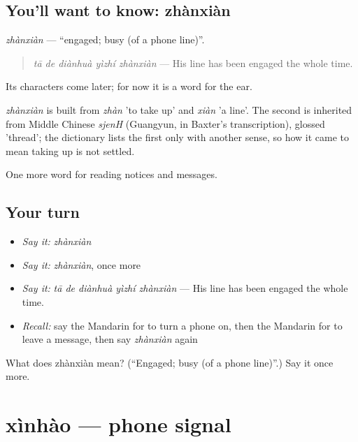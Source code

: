 \subsection*{You'll want to know: zhànxiàn}
\emph{zhànxiàn} — \textquotedblleft{}engaged; busy (of a phone line)\textquotedblright{}.

\begin{quote}
\emph{tā de diànhuà yìzhí zhànxiàn} — His line has been engaged the whole time.
\end{quote}

Its characters come later; for now it is a word for the ear.

\begin{cousinweb}
\emph{zhànxiàn} is built from \emph{zhàn} 'to take up' and \emph{xiàn} 'a line'. The second is inherited from Middle Chinese \emph{sjenH} (Guangyun, in Baxter's transcription), glossed 'thread'; the dictionary lists the first only with another sense, so how it came to mean taking up is not settled.
\end{cousinweb}

\begin{grammarlens}[title={What you've built}]
One more word for reading notices and messages.
\end{grammarlens}

\subsection*{Your turn}
\begin{itemize}
\raggedright
  \item \emph{Say it:} \emph{zhànxiàn}
  \item \emph{Say it:} \emph{zhànxiàn}, once more
  \item \emph{Say it:} \emph{tā de diànhuà yìzhí zhànxiàn} — His line has been engaged the whole time.
  \item \emph{Recall:} say the Mandarin for to turn a phone on, then the Mandarin for to leave a message, then say \emph{zhànxiàn} again
\end{itemize}

\begin{tcolorbox}[breakable,colback=teal!4,colframe=teal!35!black,title={Before you move on}]
What does zhànxiàn mean? (\textquotedblleft{}Engaged; busy (of a phone line)\textquotedblright{}.) Say it once more.
\end{tcolorbox}
\section[xìnhào]{xìnhào — phone signal}

